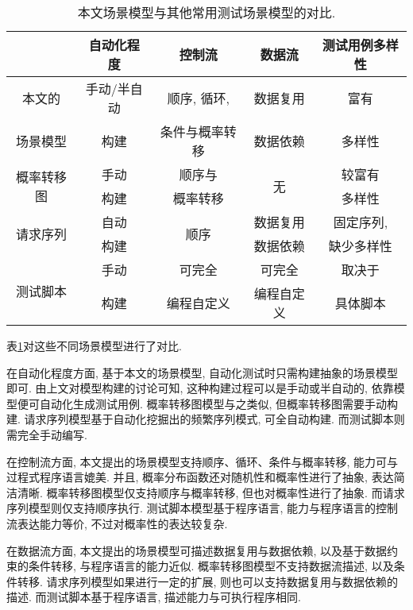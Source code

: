         \begin{table}[!htb]
            \centering
            \begin{tabular}{ccccc}
                \toprule
                 & 自动化程度 & 控制流 & 数据流 & 测试用例多样性 \\
                \midrule
                本文的 & 手动/半自动 & 顺序, 循环,  & 数据复用 & 富有 \\
                场景模型   & 构建 & 条件与概率转移 & 数据依赖 & 多样性 \\
                \hline
                \multirow{2}{*}{概率转移图\cite{junyiw17}} & 手动 & 顺序与 & \multirow{2}{*}{无} & 较富有 \\
                & 构建 & 概率转移 &  & 多样性 \\
                \hline
                \multirow{2}{*}{请求序列\cite{taox06}\cite{xiaodongg16}} & 自动 & \multirow{2}{*}{顺序} & 数据复用 & 固定序列, \\
                & 构建 &  & 数据依赖 & 缺少多样性 \\
                \hline
                \multirow{2}{*}{测试脚本} & 手动 & 可完全 & 可完全 & 取决于 \\
                & 构建 & 编程自定义 & 编程自定义 & 具体脚本 \\
                \bottomrule
            \end{tabular}
            \caption{本文场景模型与其他常用测试场景模型的对比.}
            \label{tab:related_work_compare}
        \end{table}
        
        表\ref{tab:related_work_compare}对这些不同场景模型进行了对比. 
        
        在自动化程度方面, 基于本文的场景模型, 自动化测试时只需构建抽象的场景模型即可. 由上文对模型构建的讨论可知, 这种构建过程可以是手动或半自动的, 依靠模型便可自动化生成测试用例. 概率转移图模型与之类似, 但概率转移图需要手动构建. 请求序列模型基于自动化挖掘出的频繁序列模式, 可全自动构建. 而测试脚本则需完全手动编写.
            
        在控制流方面, 本文提出的场景模型支持顺序、循环、条件与概率转移, 能力可与过程式程序语言媲美. 并且, 概率分布函数还对随机性和概率性进行了抽象, 表达简洁清晰. 概率转移图模型仅支持顺序与概率转移, 但也对概率性进行了抽象. 而请求序列模型则仅支持顺序执行. 测试脚本模型基于程序语言, 能力与程序语言的控制流表达能力等价, 不过对概率性的表达较复杂.
            
        在数据流方面, 本文提出的场景模型可描述数据复用与数据依赖, 以及基于数据约束的条件转移, 与程序语言的能力近似. 概率转移图模型不支持数据流描述, 以及条件转移. 请求序列模型如果进行一定的扩展, 则也可以支持数据复用与数据依赖的描述. 而测试脚本基于程序语言, 描述能力与可执行程序相同.
            
